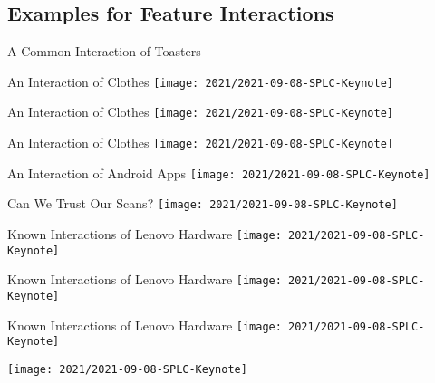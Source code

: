 \documentclass[
	aspectratio=169, %
	8pt, %
	handout, %
]{beamer}
\begin{document}
\subsection{Examples for Feature Interactions}
\begin{frame}{A Common Interaction of Toasters}
\end{frame}

\begin{frame}{An Interaction of Clothes}
	\centering\texttt{[image: 2021/2021-09-08-SPLC-Keynote]}
\end{frame}
\begin{frame}{An Interaction of Clothes}
	\centering\texttt{[image: 2021/2021-09-08-SPLC-Keynote]}
\end{frame}
\begin{frame}{An Interaction of Clothes}
	\centering\texttt{[image: 2021/2021-09-08-SPLC-Keynote]}
\end{frame}

\begin{frame}{An Interaction of Android Apps}
	\centering\texttt{[image: 2021/2021-09-08-SPLC-Keynote]}
\end{frame}

\begin{frame}{Can We Trust Our Scans?}
	\centering\texttt{[image: 2021/2021-09-08-SPLC-Keynote]}
\end{frame}

\begin{frame}{Known Interactions of Lenovo Hardware}
	\centering\texttt{[image: 2021/2021-09-08-SPLC-Keynote]}
\end{frame}
\begin{frame}{Known Interactions of Lenovo Hardware}
	\centering\texttt{[image: 2021/2021-09-08-SPLC-Keynote]}
\end{frame}
\begin{frame}{Known Interactions of Lenovo Hardware}
	\centering\texttt{[image: 2021/2021-09-08-SPLC-Keynote]}
\end{frame}
\begin{frame}
	\centering\texttt{[image: 2021/2021-09-08-SPLC-Keynote]}
\end{frame}
\end{document}
